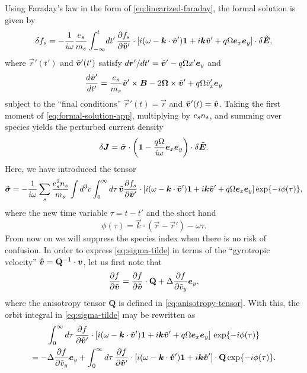 \documentclass[aps,pre,notitlepage,amsmath,amssymb,amsfonts,nobibnotes,nofootinbib,superscriptaddress]{revtex4-1}
\begin{document}
Using Faraday's law in the form of \cref{eq:linearized-faraday}, the formal
solution is given by
\begin{equation}
  \label{eq:formal-solution-app}
  \delta f_s = -\frac{1}{i\omega}\frac{\qs}{m_s}\int_{-\infty}^t\!dt'\,
  \pder{f_s}{\tvec{v}'}
  \cdot[i(\omega - \vec{k}\cdot\tvec{v}')\mathbf{1} + i\vec{k}\tvec{v}'
  + q\Omega\ex\ey]
  \cdot\delta\tvec{E},
\end{equation}
where $\vec{r}'(t')$ and $\tilde{\bm{v}}'(t')$ satisfy
$d\bm{r}'/dt'=\tilde{\bm{v}}'-q\Omega{}x'\bm{e}_y$ and
\begin{equation}
  \label{eq:unperturbed-eom}
  \der{\tvec{v}'}{t'} = \frac{\qs}{m_s}\tvec{v}'\times\vec{B}
  - 2\vec{\Omega}\times\tvec{v}' + q\Omega\tilde{v}_x'\ey
\end{equation}
subject to the ``final conditions'' $\vec{r}'(t)=\vec{r}$ and
$\tilde{\bm{v}}'(t)=\tilde{\bm{v}}$. Taking the first moment of
\cref{eq:formal-solution-app}, multiplying by $e_s n_s$, and summing over
species yields the perturbed current density
\begin{equation}
  \label{eq:conductive-relation-tilde}
  \delta\vec{J} = \tvec{\sigma}
  \cdot\left(\mathbf{1} - \frac{q\Omega}{i\omega}\ex\ey\right)
  \cdot\delta\tvec{E}.
\end{equation}
Here, we have introduced the tensor
\begin{equation}
  \label{eq:sigma-tilde}
  \tvec{\sigma}
  = -\frac{1}{i\omega}\sums\frac{\qs^2n_s}{m_s}\int d^3v\int_0^\infty d\tau\,
  \tvec{v}\pder{f_s}{\tvec{v}'}
  \cdot[i(\omega - \vec{k}\cdot\tvec{v}')\mathbf{1} + i\vec{k}\tvec{v}'
  + q\Omega\ex\ey]\exp\{-i\phi(\tau)\},
\end{equation}
where the new time variable $\tau=t-t'$ and the short hand
\begin{equation}
  \phi(\tau) = \vec{k}\cdot(\vec{r} - \vec{r}') - \omega\tau.
\end{equation}
From now on we will suppress the species index when there is no risk of
confusion. In order to express \cref{eq:sigma-tilde} in terms of the
``gyrotropic velocity'' $\bm{\mathring{v}}=\mathbf{Q}^{-1}\cdot\bm{v}$, let us first note
that
\begin{equation}
  \label{eq:df-dvtwiddle}
  \pder{f}{\tvec{v}}
  = \pder{f}{\vvc}\cdot\mathbf{Q} + \Delta\pder{f}{\tilde{v}_y}\ey,
\end{equation}
where the anisotropy tensor $\mathbf{Q}$ is defined in
\cref{eq:anisotropy-tensor}. With this, the orbit integral in
\cref{eq:sigma-tilde} may be rewritten as
\begin{multline}
  \label{eq:by-parts}
  \int_0^\infty d\tau\,\pder{f}{\tvec{v}'}
  \cdot[i(\omega - \vec{k}\cdot\tvec{v}')\mathbf{1} + i\vec{k}\tvec{v}'
  + q\Omega\ex\ey]
  \,\exp\{-i\phi(\tau)\} \\
  = -\Delta\pder{f}{\tilde{v}_y}\ey
  + \int_0^\infty d\tau\,\pder{f}{\vvc'}
  \cdot[i(\omega - \vec{k}\cdot\vvc')\mathbf{1} + i\vec{k}\vvc']
  \cdot\mathbf{Q}\exp\{-i\phi(\tau)\}.
\end{multline}
\end{document}
